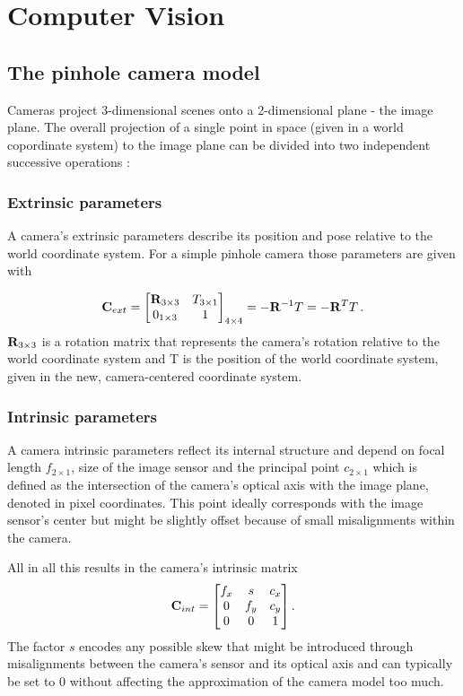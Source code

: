 \section { Computer Vision }
	\subsection { The pinhole camera model }
		Cameras project 3-dimensional scenes onto a 2-dimensional plane - the image plane.
		The overall projection of a single point in space (given in a world copordinate system) to the image plane can be divided into two independent successive operations \cite[S.~50]{Szeliski2010}:
		
		\subsubsection{Extrinsic parameters}
			A camera's extrinsic parameters describe its position and pose relative to the world coordinate system. For a simple pinhole camera those parameters are given with 
			
			\begin{equation}
			\mathbf{C}_{ext} = \begin{bmatrix}
						\mathbf{R}_{3\times 3} & T_{3\times 1}\\
						0_{1\times 3} & 1
						\end{bmatrix}_{4\times 4} = -\mathbf{R}^{-1}T = -\mathbf{R}^TT \, . 
			\end{equation}
			$\mathbf{R}_{3\times 3}$ is a rotation matrix that represents the camera's rotation relative to the world coordinate system and T is the position of the world coordinate system, given in the new, camera-centered coordinate system. 
	
		\subsubsection{Intrinsic parameters}
			A camera intrinsic parameters reflect its internal structure and depend on focal length $f_{2\times 1}$, size of the image sensor and the principal point $c_{2\times1}$ which is defined as the intersection of the camera's optical axis with the image plane, denoted in pixel coordinates. This point ideally corresponds with the image sensor's center but might be slightly offset because of small misalignments within the camera.
			
			All in all this results in the camera's intrinsic matrix
			\begin{equation}
			\mathbf{C}_{int} = \begin{bmatrix}
				f_x & s & c_x  \\
				0 & f_y & c_y \\
				0 & 0 & 1 
				\end{bmatrix}.
			\end{equation}
			The factor $s$ encodes any possible skew that might be introduced through misalignments between the camera's sensor and its optical axis and can typically be set to $0$ without affecting the approximation of the camera model too much.
		
